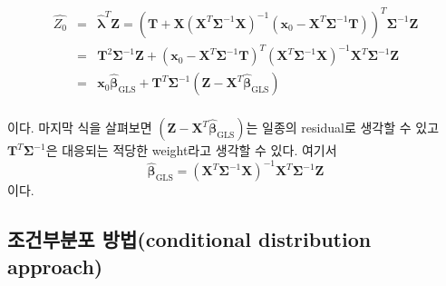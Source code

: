 \documentclass[b5paper,]{scrbook}
\theoremstyle{plain}
\theoremstyle{definition}
\numberwithin{equation}{section}
\begin{document}
\begin{eqnarray*}
\hat{Z_{0}}&=&\hat{\boldsymbol{\lambda}}^{T}\mathbf{Z}=(\mathbf{T}+\mathbf{X}(\mathbf{X}^{T}\boldsymbol{\Sigma}^{-1}\mathbf{X})^{-1}(\mathbf{x}_{0}-\mathbf{X}^{T}\boldsymbol{\Sigma}^{-1}\mathbf{T}))^{T}\boldsymbol{\Sigma}^{-1}\mathbf{Z}\\
&=&\mathbf{T}^{2}\boldsymbol{\Sigma}^{-1}\mathbf{Z}+(\mathbf{x}_{0}-\mathbf{X}^{T}\boldsymbol{\Sigma}^{-1}\mathbf{T})^{T}(\mathbf{X}^{T}\boldsymbol{\Sigma}^{-1}\mathbf{X})^{-1}\mathbf{X}^{T}\boldsymbol{\Sigma}^{-1}\mathbf{Z}\\
&=&\mathbf{x}_{0}\hat{\boldsymbol{\beta}}_{\text{GLS}}+\mathbf{T}^{T}\boldsymbol{\Sigma}^{-1}(\mathbf{Z}-\mathbf{X}^{T}\hat{\boldsymbol{\beta}}_{\text{GLS}})\\
\end{eqnarray*}

이다. 마지막 식을 살펴보면
\((\mathbf{Z}-\mathbf{X}^{T}\hat{\boldsymbol{\beta}}_{\text{GLS}})\)는
일종의 residual로 생각할 수 있고
\(\mathbf{T}^{T}\boldsymbol{\Sigma}^{-1}\)은 대응되는 적당한 weight라고
생각할 수 있다. 여기서
\[\hat{\boldsymbol{\beta}}_{\text{GLS}}=(\mathbf{X}^{T}\boldsymbol{\Sigma}^{-1}\mathbf{X})^{-1}\mathbf{X}^{T}\boldsymbol{\Sigma}^{-1}\mathbf{Z}\]
이다.

\subsection{조건부분포 방법(conditional distribution
approach)}\label{-conditional-distribution-approach}
\end{document}
